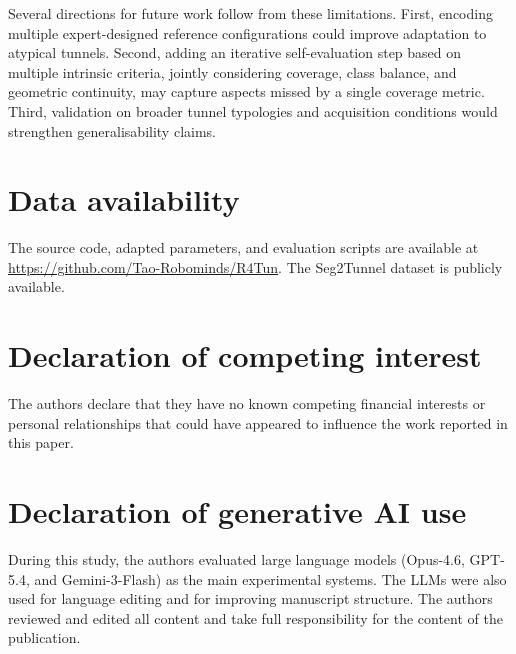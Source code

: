 \documentclass[a4paper,fleqn]{cas-dc}
\begin{document}
{Several directions for future work follow from these limitations. First, encoding multiple expert-designed reference configurations could improve adaptation to atypical tunnels. Second, adding an iterative self-evaluation step based on multiple intrinsic criteria, jointly considering coverage, class balance, and geometric continuity, may capture aspects missed by a single coverage metric. Third, validation on broader tunnel typologies and acquisition conditions would strengthen generalisability claims.


\section*{Data availability}

The source code, adapted parameters, and evaluation scripts are available at \url{https://github.com/Tao-Robominds/R4Tun}. The Seg2Tunnel dataset is publicly available.

\section*{Declaration of competing interest}

The authors declare that they have no known competing financial interests or personal relationships that could have appeared to influence the work reported in this paper.

\section*{Declaration of generative AI use}

During this study, the authors evaluated large language models (Opus-4.6, GPT-5.4, and Gemini-3-Flash) as the main experimental systems. The LLMs were also used for language editing and for improving manuscript structure. The authors reviewed and edited all content and take full responsibility for the content of the publication.



}
\end{document}
